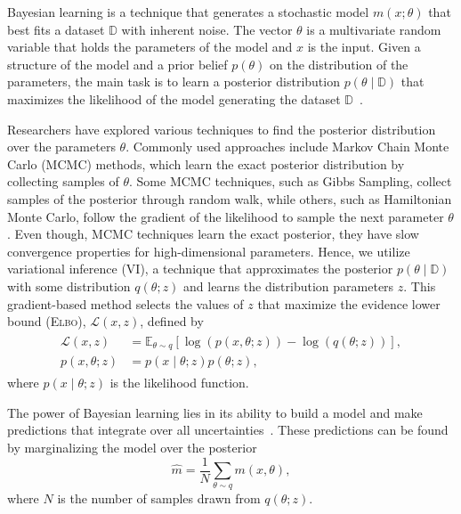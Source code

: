 Bayesian learning is a technique that generates a stochastic model $m(x;
\theta)$ that best fits a dataset $\mathbb{D}$ with inherent noise. 
%
The vector $\theta$ is a multivariate random variable that holds the parameters
of the model and $x$ is the input.
%
Given a structure of the model and a prior belief $p(\theta)$ on the
distribution of the parameters, the main task is to learn a posterior
distribution $p(\theta \mid \mathbb{D})$ that maximizes the likelihood of the
model generating the dataset $\mathbb{D}$~\cite{bishop2006pattern}. 
%

Researchers have explored various techniques to find the posterior distribution
over the parameters $\theta$. 
%
Commonly used approaches include Markov Chain Monte Carlo (MCMC) methods, which
learn the exact posterior distribution by collecting samples of $\theta$. 
%
Some MCMC techniques, such as Gibbs Sampling, collect samples of the posterior
through random walk, while others, such as Hamiltonian Monte Carlo, follow the
gradient of the likelihood to sample the next parameter $\theta$.
%
Even though, MCMC techniques learn the exact posterior, they have slow
convergence properties for high-dimensional parameters. 
%
Hence, we utilize variational inference (VI), a technique that approximates the
posterior $p(\theta \mid \mathbb{D})$ with some distribution $q(\theta;z)$ and
learns the distribution parameters $z$. 
%
This gradient-based method selects the values of $z$ that maximize the evidence
lower bound (\textsc{Elbo}), $\mathcal{L}(x, z)$, defined
by~\cite{cohen2016bayesian}
\begin{align}
  \begin{split}
  \mathcal{L}(x,z) &= \mathbb{E}_{\theta \sim q} \left[\log(p(x, \theta;z)) - \log(q(\theta;z)) \right], \\
  p(x, \theta;z) &= p(x \mid \theta;z)p(\theta;z),
  \end{split}
  \label{eq:elbo}
\end{align}
where $p(x \mid \theta;z)$ is the likelihood function. 

The power of Bayesian learning lies in its ability to build a model and make
predictions that integrate over all uncertainties~\cite{tipping2003bayesian}.
These predictions can be found by marginalizing the model over the
posterior~\cite{jospin2020hands}
\begin{equation}
  \hat{m} = \frac{1}{N} \sum_{\theta \sim q} m(x, \theta),
  \label{eqn:marginalization}
\end{equation} 
where $N$ is the number of samples drawn from $q(\theta;z)$. 
%


